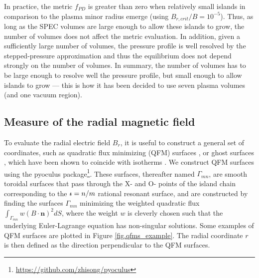 \documentclass[my_thesis.tex]{subfiles}
\begin{document}
In practice, the metric $f_{PD}$ is greater than zero when relatively small islands in comparison to the plasma minor radius emerge (using $ B_{r,crit}/B=10^{-5}$). Thus, as long as the SPEC volumes are large enough to allow these islands to grow, the number of volumes does not affect the metric evaluation. In addition, given a sufficiently large number of volumes, the pressure profile is well resolved by the stepped-pressure approximation and thus the equilibrium does not depend strongly on the number of volumes. In summary, the number of volumes has to be large enough to resolve well the pressure profile, but small enough to allow islands to grow --- this is how it has been decided to use seven plasma volumes (and one vacuum region).





\subsection{Measure of the radial magnetic field} \label{sec. measure b r}
To evaluate the radial electric field $ B_r$, it is useful to construct a general set of coordinates, such as quadratic flux minimizing (QFM) surfaces \citep{dewarAlmostInvariantManifolds1994, hudsonAlmostinvariantSurfacesMagnetic1996, hudsonConstructionIntegrableField1998}, or ghost surfaces \citep{hudsonAreGhostSurfaces2009}, which have been shown to coincide with isotherms \citep{Hudson2008}. We construct QFM surfaces  using the pyoculus package\footnote{\url{https://github.com/zhisong/pyoculus}}. These surfaces, thereafter named $\Gamma_{mn}$, are smooth toroidal surfaces that pass through the X- and O- points of the island chain corresponding to the $\text{$\iota\!\!$-}=n/m$ rational resonant surface, and are constructed by finding the surfaces $\Gamma_{mn}$ minimizing the weighted quadratic flux $\int_{\Gamma_{mn}} w (B\cdot\mathbf{n})^2 dS$, where the weight $w$ is cleverly chosen such that the underlying Euler-Lagrange equation has non-singular solutions. Some examples of QFM surfaces are plotted in Figure \ref{fig.qfms_example}. The radial coordinate $r$ is then defined as the direction perpendicular to the QFM surfaces.
\end{document}
